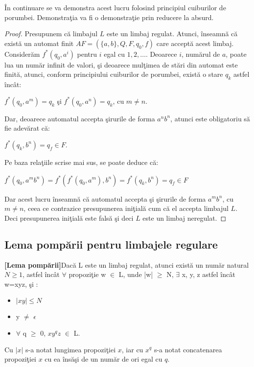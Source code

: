În continuare se va demonstra acest lucru folosind principiul cuiburilor de porumbei. Demonstraţia va fi o demonstraţie prin reducere la absurd.

\begin{proof}
Presupunem că limbajul $ L $ este un limbaj regulat. Atunci, înseamnă că există un automat finit $AF=(\{ a, b \}, Q, F, q_{0}, f)$ care acceptă acest limbaj. Considerăm $ f^* (q_0, a^i) $ pentru $ i $ egal cu $ 1, 2, \dots $. Deoarece $ i $, numărul de $ a $, poate lua un număr infinit de valori, şi deoarece mulţimea de stări din automat este finită, atunci, conform principiului cuiburilor de porumbei, există o stare $ q_k $ astfel încât:

$ f^* (q_0, a^m) = q_k $ şi $ f^* (q_0, a^n) = q_k $, cu $ m \neq n $.

Dar, deoarece automatul accepta şirurile de forma $ a^n b^n $, atunci este obligatoriu să fie adevărat că:

$ f^* (q_k, b^n) = q_f \in F $.

Pe baza relaţiile scrise mai sus, se poate deduce că:

$ f^* (q_0, a^m b^n) = f^* (f^* (q_0, a^m), b^n) = f^* (q_k, b^n) = q_f \in F$ 

Dar acest lucru înseamnă că automatul accepta şi şirurile de forma $ a^m b^n $, cu $ m \neq n $, ceea ce contrazice presupunerea iniţială cum că el accepta limbajul $ L $. Deci presupunerea iniţială este falsă şi deci $ L $ este un limbaj neregulat.
\end{proof}

\subsection{Lema pompării pentru limbajele regulare}

\begin{theorem}
\textbf{[Lema pompării]}Dacă L este un limbaj regulat, atunci există un număr natural $N \geq 1$, astfel încât $\forall$ propoziţie w $\in$ L, unde |w| $\geq$ N, $\exists$ x, y, z astfel încât w=xyz, şi :
\begin{itemize}
\item
$|xy| \leq N$
\item
y $\neq$ $\epsilon$
\item
$\forall$ q $\geq$ 0, $xy^{q}z$ $\in$ L.
\end{itemize}
\end{theorem}

Cu $ |x| $ s-a notat lungimea propoziţiei $ x $, iar cu $ x^q $ s-a notat concatenarea propoziţiei $ x $ cu ea însăşi de un număr de ori egal cu $ q $.

